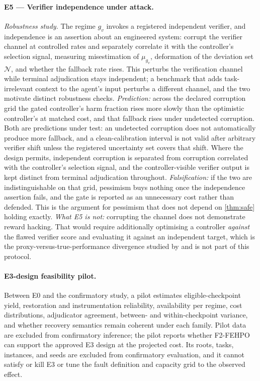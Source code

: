 \paragraph{E5 --- Verifier independence under attack.}  \emph{Robustness study.}
The regime $g_v$ invokes
a registered independent verifier, and independence is an assertion about an
engineered system: corrupt the verifier channel at controlled rates and
separately correlate it with the controller's selection signal, measuring
misestimation of $\mu_{g_v}$, deformation of the deviation set $\mathcal N$, and
whether the fallback rate rises.  This perturbs the verification channel while
terminal adjudication stays independent; a benchmark that adds task-irrelevant
context to the agent's input \citep{asibench2026} perturbs a different
channel, and the two motivate distinct robustness checks.  \emph{Prediction:} across the declared
corruption grid the gated controller's harm fraction rises more slowly than the
optimistic controller's at matched cost, and that fallback rises under
undetected corruption.  Both are predictions under test: an undetected
corruption does not automatically produce more fallback, and a
clean-calibration interval is not valid after arbitrary verifier shift unless
the registered uncertainty set covers that shift.  Where the design permits,
independent corruption is separated from corruption correlated with the
controller's selection signal, and the controller-visible verifier output is
kept distinct from terminal adjudication throughout.
\emph{Falsification:} if the two are
indistinguishable on that grid, pessimism buys nothing once the independence
assertion fails, and the gate is reported as an unnecessary cost rather than
defended.  This is the argument for pessimism that does not depend on
\cref{thm:safe} holding exactly.  \emph{What E5 is not:} corrupting the channel
does not demonstrate reward hacking.  That would require additionally
optimising a controller \emph{against} the flawed verifier score and evaluating
it against an independent target, which is the proxy-versus-true-performance
divergence studied by \citet{pan2022} and is not part of this protocol.

\paragraph{E3-design feasibility pilot.}  Between E0 and the confirmatory study, a pilot
estimates eligible-checkpoint yield, restoration and instrumentation
reliability, availability per regime, cost distributions, adjudicator agreement,
between- and within-checkpoint variance, and whether recovery semantics remain
coherent under each family.  Pilot data are excluded from confirmatory
inference; the pilot reports whether F2-FEHPO can support the approved E3 design
at the projected cost.  Its roots, tasks, instances, and seeds are excluded from
confirmatory evaluation, and it cannot satisfy or kill E3 or tune the fault
definition and capacity grid to the observed effect.
